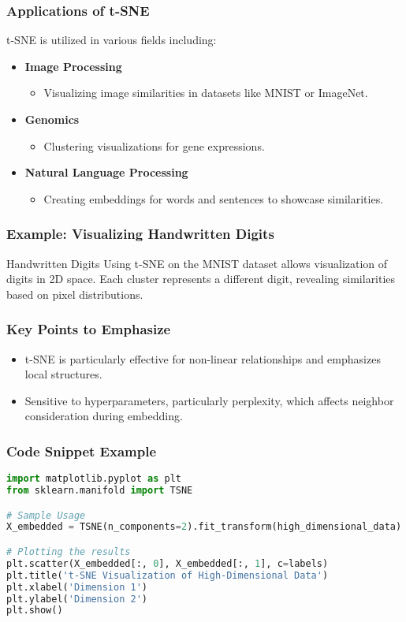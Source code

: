 \documentclass[aspectratio=169]{beamer}
\begin{document}
\begin{frame}[fragile]
  \frametitle{Applications of t-SNE}
  t-SNE is utilized in various fields including:
  \begin{itemize}
    \item \textbf{Image Processing}
      \begin{itemize}
        \item Visualizing image similarities in datasets like MNIST or ImageNet.
      \end{itemize}
    \item \textbf{Genomics}
      \begin{itemize}
        \item Clustering visualizations for gene expressions.
      \end{itemize}
    \item \textbf{Natural Language Processing}
      \begin{itemize}
        \item Creating embeddings for words and sentences to showcase similarities.
      \end{itemize}
  \end{itemize}
\end{frame}

\begin{frame}[fragile]
  \frametitle{Example: Visualizing Handwritten Digits}
  \begin{block}{Handwritten Digits}
    Using t-SNE on the MNIST dataset allows visualization of digits in 2D space. Each cluster represents a different digit, revealing similarities based on pixel distributions.
  \end{block}
\end{frame}

\begin{frame}[fragile]
  \frametitle{Key Points to Emphasize}
  \begin{itemize}
    \item t-SNE is particularly effective for non-linear relationships and emphasizes local structures.
    \item Sensitive to hyperparameters, particularly perplexity, which affects neighbor consideration during embedding.
  \end{itemize}
\end{frame}

\begin{frame}[fragile]
  \frametitle{Code Snippet Example}
  \begin{lstlisting}[language=Python]
import matplotlib.pyplot as plt
from sklearn.manifold import TSNE

# Sample Usage
X_embedded = TSNE(n_components=2).fit_transform(high_dimensional_data)

# Plotting the results
plt.scatter(X_embedded[:, 0], X_embedded[:, 1], c=labels)
plt.title('t-SNE Visualization of High-Dimensional Data')
plt.xlabel('Dimension 1')
plt.ylabel('Dimension 2')
plt.show()
  \end{lstlisting}
\end{frame}
\end{document}
